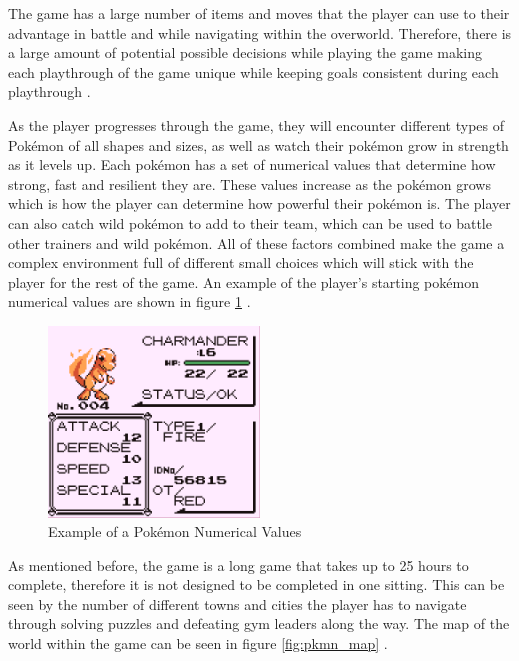 The game has a large number of items and moves that the player can use to their advantage in battle and while navigating within the overworld. Therefore, there is a large amount of potential possible decisions while playing the game making each playthrough of the game unique while keeping goals consistent during each playthrough \cite {HubZ_1998}.

As the player progresses through the game, they will encounter different types of Pokémon of all shapes and sizes, as well as watch their pokémon grow in strength as it levels up. Each pokémon has a set of numerical values that determine how strong, fast and resilient they are. These values increase as the pokémon grows which is how the player can determine how powerful their pokémon is. The player can also catch wild pokémon to add to their team, which can be used to battle other trainers and wild pokémon. All of these factors combined make the game a complex environment full of different small choices which will stick with the player for the rest of the game. An example of the player's starting pokémon numerical values are shown in figure \ref{fig:pkmn_stats} \cite{HubZ_1998}.

\begin{figure}[H]
    \centering
    \includegraphics[width=0.5\textwidth]{figures/red_stats.png}
    \caption{Example of a Pokémon Numerical Values}
    \label{fig:pkmn_stats}
\end{figure}

As mentioned before, the game is a long game that takes up to 25 hours to complete, therefore it is not designed to be completed in one sitting. This can be seen by the number of different towns and cities the player has to navigate through solving puzzles and defeating gym leaders along the way. The map of the world within the game can be seen in figure \ref{fig:pkmn_map} \cite{HubZ_1998}. 

